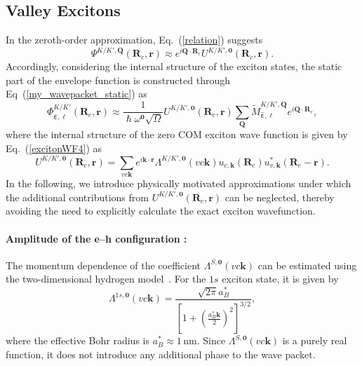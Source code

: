 \subsection{Valley Excitons}
In the zeroth-order approximation, Eq.~(\ref{relation}) suggests
\begin{equation}
\Psi^{K/K',\boldsymbol{Q}}(\boldsymbol{R}_c,\boldsymbol{r})
\approx
e^{i\boldsymbol{Q}\cdot\boldsymbol{R}_c}
U^{K/K',\boldsymbol{0}} (\boldsymbol{R}_c,\boldsymbol{r}).
\end{equation}
Accordingly, considering the internal structure of the exciton states, the static part of the envelope function is constructed through Eq~(\ref{my_wavepacket_static}) as
\begin{equation}
\Phi^{K/K'}_{\hat{\boldsymbol{\varepsilon}}, \ell}(\boldsymbol{R}_c, \boldsymbol{r})
\approx
\frac{1}{\hslash \omega^{\boldsymbol{0}} \sqrt{\Omega}}
U^{K/K',\boldsymbol{0}} (\boldsymbol{R}_c,\boldsymbol{r})
\sum_{\boldsymbol{Q}}
\tilde{M}_{\hat{\boldsymbol{\varepsilon}}, \ell}^{K/K',\boldsymbol{Q}}
e^{i\boldsymbol{Q}\cdot\boldsymbol{R}_c},
\label{envelope_valley}
\end{equation}
where the internal structure of the zero COM exciton wave function is given by Eq.~(\ref{excitonWF4}) as
\begin{equation}
U^{K/K',\boldsymbol{0}} (\boldsymbol{R}_c,\boldsymbol{r})
=
\sum_{vc\boldsymbol{k}}
e^{i\boldsymbol{k}\cdot\boldsymbol{r}}
\Lambda^{K/K',\boldsymbol{0}}(vc\boldsymbol{k})
u_{c,\boldsymbol{k}}(\boldsymbol{R}_c)
u^{*}_{v,\boldsymbol{k}}
(\boldsymbol{R}_c-\boldsymbol{r}).
\label{U_function}
\end{equation}
In the following, we introduce physically motivated approximations under which the additional contributions from $U^{K/K',\boldsymbol{0}} (\boldsymbol{R}_c,\boldsymbol{r})$ can be neglected, thereby avoiding the need to explicitly calculate the exact exciton wavefunction.
\vspace{-1em}
\paragraph*{Amplitude of the e--h configuration : }
The momentum dependence of the coefficient
$\Lambda^{S,\boldsymbol{0}}(vc\boldsymbol{k})$
can be estimated using the two-dimensional hydrogen model~\cite{parfitt2002twodimensional}.
For the $1s$ exciton state, it is given by
\begin{equation}
\Lambda^{1s,\boldsymbol{0}}(vc\boldsymbol{k})
=
\frac{\sqrt{2\pi}a_{B}^{*}}
{\left[1+\left(\frac{a_{B}^{*}\boldsymbol{k}}{2}\right)^2\right]^{3/2}},
\end{equation}
where the effective Bohr radius is
$a_B^*\approx1\,\mathrm{nm}$.
Since
$\Lambda^{S,\boldsymbol{0}}(vc\boldsymbol{k})$
is a purely real function, it does not introduce any additional phase to the wave packet.
\vspace{-1em}
